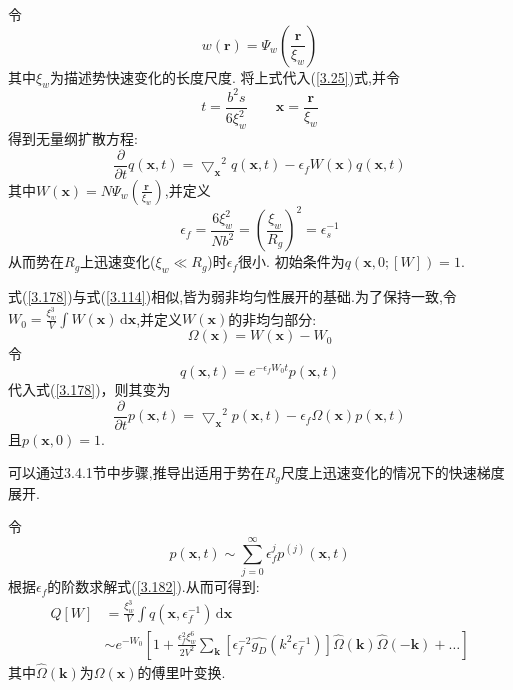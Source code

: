 令
\begin{equation}
w(\mathbf{r}) = \Psi_w (\frac{\mathbf{r}}{\xi_w})
\end{equation}
其中$\xi_w$为描述势快速变化的长度尺度.
将上式代入(\ref{3.25})式,并令
\begin{equation}
t = \frac{b^2 s}{6\xi_w^2} \qquad \mathbf{x} = \frac{\mathbf{r}}{\xi_w}
\end{equation}
得到无量纲扩散方程:
\begin{equation}
\frac{\partial}{\partial t}q(\mathbf{x},t) = {\bigtriangledown_{\mathbf{x}}}^2 q(\mathbf{x},t) - \epsilon_f W(\mathbf{x})q(\mathbf{x},t) \label{3.178}
\end{equation}
其中$W(\mathbf{x}) = N\Psi_w(\frac{\mathbf{r}}{\xi_w})$,并定义
\begin{equation}
\epsilon_f = \frac{6\xi_w^2}{Nb^2} = (\frac{\xi_w}{R_g})^2 = \epsilon_s^{-1}
\end{equation}
从而势在$R_g$上迅速变化($\xi_w \ll R_g$)时$\epsilon_f$很小.
初始条件为$q(\mathbf{x},0;[W]) = 1$.

式(\ref{3.178})与式(\ref{3.114})相似,皆为弱非均匀性展开的基础.为了保持一致,令$W_0 = \frac{\xi_w^3}{V}\int W(\mathbf{x})\,\mathrm{d}\mathbf{x}$,并定义$W(\mathbf{x})$的非均匀部分:
\begin{equation}
\Omega(\mathbf{x}) = W(\mathbf{x}) - W_0
\end{equation}
令
\begin{equation}
q(\mathbf{x},t) = e^{-\epsilon_f W_0 t}p(\mathbf{x},t)
\end{equation}
代入式(\ref{3.178})，则其变为
\begin{equation}
\frac{\partial}{\partial t}p(\mathbf{x},t) = {\bigtriangledown_{\mathbf{x}}}^2 p(\mathbf{x},t) - \epsilon_f \Omega(\mathbf{x})p(\mathbf{x},t)\label{3.182}
\end{equation}
且$p(\mathbf{x},0) = 1$.

可以通过3.4.1节中步骤,推导出适用于势在$R_g$尺度上迅速变化的情况下的快速梯度展开.

令
\begin{equation}
p(\mathbf{x},t)\sim \sum_{j=0}^{\infty}\epsilon_f^jp^{(j)}(\mathbf{x},t)\label{3.183}
\end{equation}
根据$\epsilon_f$的阶数求解式(\ref{3.182}).从而可得到:
\begin{equation}
\begin{aligned}
Q[W] &= \frac{\xi_w^3}{V}\int q(\mathbf{x},\epsilon_f^{-1})\,\mathrm{d}\mathbf{x}\\
 &\sim e^{-W_0}[1+\frac{\epsilon_f^2 \xi_w^6}{2V^2}\sum_{\mathbf{k}}[\epsilon_f^{-2}\hat{g_D}(k^2\epsilon_f^{-1})]\hat{\Omega}(\mathbf{k})\hat{\Omega}(-\mathbf{k})+\dots]
\end{aligned}
\end{equation}
其中$\hat{\Omega}(\mathbf{k})$为$\Omega(\mathbf{x})$的傅里叶变换.


